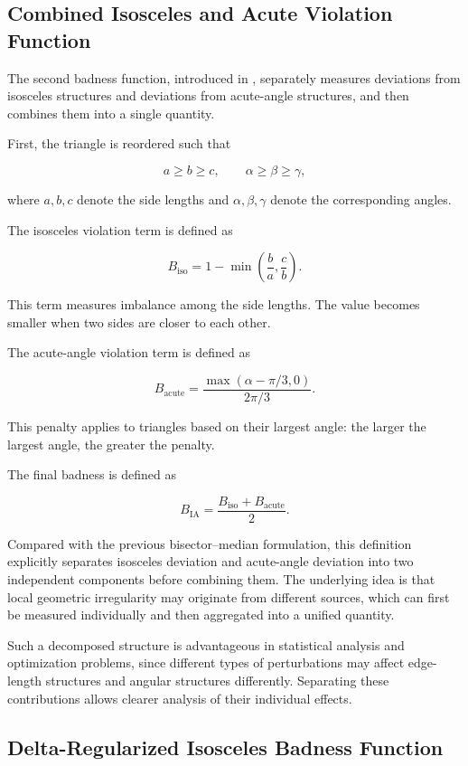 \documentclass[11pt]{article}
\begin{document}
\subsection{Combined Isosceles and Acute Violation Function}

The second badness function, introduced in \cite{11012008}, separately measures deviations from isosceles structures and deviations from acute-angle structures, and then combines them into a single quantity.

First, the triangle is reordered such that

\[
a\ge b\ge c,
\qquad
\alpha\ge\beta\ge\gamma ,
\]

where \(a,b,c\) denote the side lengths and \(\alpha,\beta,\gamma\) denote the corresponding angles.

The isosceles violation term is defined as

\[
B_{\mathrm{iso}}
=
1-\min\left(\frac{b}{a},\frac{c}{b}\right).
\]

This term measures imbalance among the side lengths. The value becomes smaller when two sides are closer to each other.

The acute-angle violation term is defined as

\[
B_{\mathrm{acute}}
=
\frac{
\max(\alpha-\pi/3,0)
}{
2\pi/3
}.
\]

This penalty applies to triangles based on their largest angle: the larger the largest angle, the greater the penalty.

The final badness is defined as

\[
B_{\mathrm{IA}}
=
\frac{
B_{\mathrm{iso}}
+
B_{\mathrm{acute}}
}{2}.
\]

Compared with the previous bisector--median formulation, this definition explicitly separates isosceles deviation and acute-angle deviation into two independent components before combining them. The underlying idea is that local geometric irregularity may originate from different sources, which can first be measured individually and then aggregated into a unified quantity.

Such a decomposed structure is advantageous in statistical analysis and optimization problems, since different types of perturbations may affect edge-length structures and angular structures differently. Separating these contributions allows clearer analysis of their individual effects.

\subsection{Delta-Regularized Isosceles Badness Function}
\end{document}
